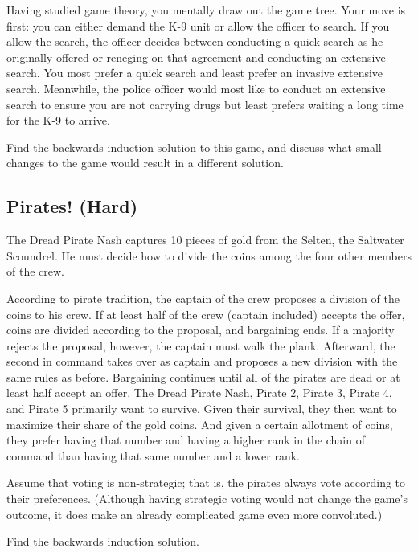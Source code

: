 \documentclass[11pt,]{article}
\begin{document}
Having studied game theory, you mentally draw out the game tree. Your
move is first: you can either demand the K-9 unit or allow the officer
to search. If you allow the search, the officer decides between
conducting a quick search as he originally offered or reneging on that
agreement and conducting an extensive search. You most prefer a quick
search and least prefer an invasive extensive search. Meanwhile, the
police officer would most like to conduct an extensive search to ensure
you are not carrying drugs but least prefers waiting a long time for the
K-9 to arrive.

Find the backwards induction solution to this game, and discuss what
small changes to the game would result in a different solution.

\hypertarget{pirates-hard}{%
\subsection{Pirates! (Hard)}\label{pirates-hard}}

The Dread Pirate Nash captures 10 pieces of gold from the Selten, the
Saltwater Scoundrel. He must decide how to divide the coins among the
four other members of the crew.

According to pirate tradition, the captain of the crew proposes a
division of the coins to his crew. If at least half of the crew (captain
included) accepts the offer, coins are divided according to the
proposal, and bargaining ends. If a majority rejects the proposal,
however, the captain must walk the plank. Afterward, the second in
command takes over as captain and proposes a new division with the same
rules as before. Bargaining continues until all of the pirates are dead
or at least half accept an offer. The Dread Pirate Nash, Pirate 2,
Pirate 3, Pirate 4, and Pirate 5 primarily want to survive. Given their
survival, they then want to maximize their share of the gold coins. And
given a certain allotment of coins, they prefer having that number and
having a higher rank in the chain of command than having that same
number and a lower rank.

Assume that voting is non-strategic; that is, the pirates always vote
according to their preferences. (Although having strategic voting would
not change the game's outcome, it does make an already complicated game
even more convoluted.)

Find the backwards induction solution.
\end{document}
